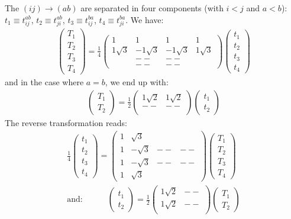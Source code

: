 \documentclass{article}
\newcommand  \equ[2]       {\begin{align}#2\label{#1}\end{align}}
\begin{document}
The $(ij)\rightarrow(ab)$ are separated in four components (with $i<j$ and $a<b$): $t_1\equiv t_{ij}^{ab}$, $t_2\equiv t_{ji}^{ab}$, $t_3\equiv t_{ij}^{ba}$, $t_4\equiv t_{ji}^{ba}$. We have:
\equ{}{
  \begin{pmatrix}T_1\\T_2\\T_3\\T_4\end{pmatrix}
  =
  \frac{1}{4}
  \begin{pmatrix}
    1 & 1 & 1 & 1\\
    1\sqrt{3} & -1\sqrt{3} & -1\sqrt{3} & 1\sqrt{3} \\
    & -- & -- & \\
    & -- & -- & 
  \end{pmatrix}
  \begin{pmatrix}t_1\\t_2\\t_3\\t_4\end{pmatrix}
}
and in the case where $a=b$, we end up with:
\equ{}{
  \begin{pmatrix}T_1\\T_2\end{pmatrix}
  =
  \frac{1}{2}
  \begin{pmatrix}
    1\sqrt{2} & 1\sqrt{2}\\
    -- & -- \\
  \end{pmatrix}
  \begin{pmatrix}t_1\\t_2\end{pmatrix}
}
The reverse transformation reads: 
\equ{}{
  \frac{1}{4}
  \begin{pmatrix}t_1\\t_2\\t_3\\t_4\end{pmatrix}
  =
  \begin{pmatrix}
    1 & \sqrt{3} & \\
    1 &-\sqrt{3} & -- & -- \\
    1 &-\sqrt{3} & -- & -- \\
    1 & \sqrt{3} & 
  \end{pmatrix}
  \begin{pmatrix}T_1\\T_2\\T_3\\T_4\end{pmatrix}
  \\\text{and:}\qquad\quad
  \begin{pmatrix}t_1\\t_2\end{pmatrix}
  =
  \frac{1}{2}
  \begin{pmatrix}
    1\sqrt{2} & --\\
    1\sqrt{2} & --\\
  \end{pmatrix}
  \begin{pmatrix}T_1\\T_2\end{pmatrix}
}
\end{document}
